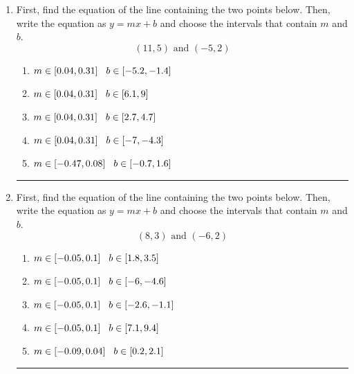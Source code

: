 \documentclass[14pt]{extbook}
\newcommand{\litem}[1]{\item#1\hspace*{-1cm}\rule{\textwidth}{0.4pt}}
\begin{document}
\begin{enumerate}
{\begin{enumerate}[label=\Alph*.]
\end{enumerate} }
\litem{
First, find the equation of the line containing the two points below. Then, write the equation as $ y=mx+b $ and choose the intervals that contain $m$ and $b$.\[ (11, 5) \text{ and } (-5, 2) \]\begin{enumerate}[label=\Alph*.]
\item \( m \in [0.04, 0.31] \hspace*{3mm} b \in [-5.2, -1.4] \)
\item \( m \in [0.04, 0.31] \hspace*{3mm} b \in [6.1, 9] \)
\item \( m \in [0.04, 0.31] \hspace*{3mm} b \in [2.7, 4.7] \)
\item \( m \in [0.04, 0.31] \hspace*{3mm} b \in [-7, -4.3] \)
\item \( m \in [-0.47, 0.08] \hspace*{3mm} b \in [-0.7, 1.6] \)

\end{enumerate} }
\litem{
First, find the equation of the line containing the two points below. Then, write the equation as $ y=mx+b $ and choose the intervals that contain $m$ and $b$.\[ (8, 3) \text{ and } (-6, 2) \]\begin{enumerate}[label=\Alph*.]
\item \( m \in [-0.05, 0.1] \hspace*{3mm} b \in [1.8, 3.5] \)
\item \( m \in [-0.05, 0.1] \hspace*{3mm} b \in [-6, -4.6] \)
\item \( m \in [-0.05, 0.1] \hspace*{3mm} b \in [-2.6, -1.1] \)
\item \( m \in [-0.05, 0.1] \hspace*{3mm} b \in [7.1, 9.4] \)
\item \( m \in [-0.09, 0.04] \hspace*{3mm} b \in [0.2, 2.1] \)


\end{enumerate}}
\end{enumerate}
\end{document}
